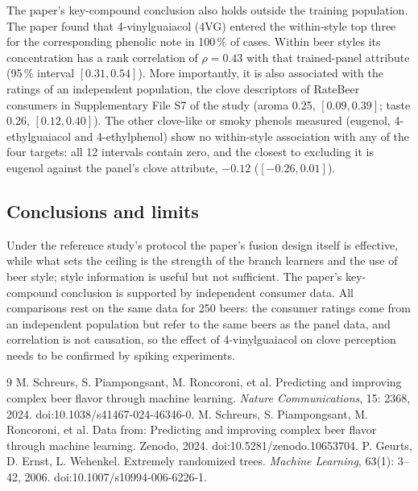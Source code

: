The paper's key-compound conclusion also holds outside the training population. The paper found that 4-vinylguaiacol (4VG) entered the within-style top three for the corresponding phenolic note in 100\,\% of cases. Within beer styles its concentration has a rank correlation of $\rho=0.43$ with that trained-panel attribute (95\,\% interval $[0.31, 0.54]$). More importantly, it is also associated with the ratings of an independent population, the clove descriptors of RateBeer consumers in Supplementary File S7 of the study (aroma 0.25, $[0.09, 0.39]$; taste 0.26, $[0.12, 0.40]$). The other clove-like or smoky phenols measured (eugenol, 4-ethylguaiacol and 4-ethylphenol) show no within-style association with any of the four targets: all 12 intervals contain zero, and the closest to excluding it is eugenol against the panel's clove attribute, $-0.12$ ($[-0.26, 0.01]$).

\subsection{Conclusions and limits}
Under the reference study's protocol the paper's fusion design itself is effective, while what sets the ceiling is the strength of the branch learners and the use of beer style; style information is useful but not sufficient. The paper's key-compound conclusion is supported by independent consumer data. All comparisons rest on the same data for 250 beers: the consumer ratings come from an independent population but refer to the same beers as the panel data, and correlation is not causation, so the effect of 4-vinylguaiacol on clove perception needs to be confirmed by spiking experiments.

\begin{thebibliography}{9}
 M. Schreurs, S. Piampongsant, M. Roncoroni, et al. Predicting and improving complex beer flavor through machine learning. \emph{Nature Communications}, 15: 2368, 2024. doi:10.1038/s41467-024-46346-0.
 M. Schreurs, S. Piampongsant, M. Roncoroni, et al. Data from: Predicting and improving complex beer flavor through machine learning. Zenodo, 2024. doi:10.5281/zenodo.10653704.
 P. Geurts, D. Ernst, L. Wehenkel. Extremely randomized trees. \emph{Machine Learning}, 63(1): 3--42, 2006. doi:10.1007/s10994-006-6226-1.
\end{thebibliography}

